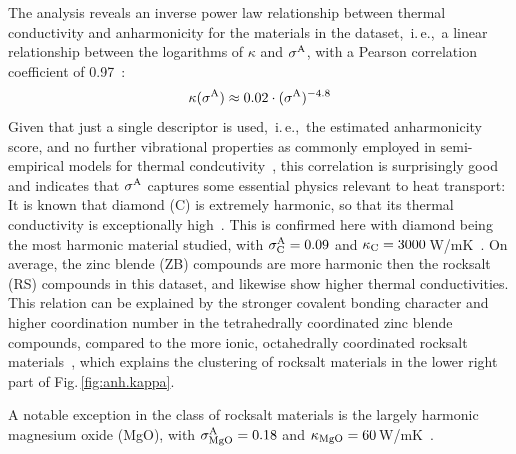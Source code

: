The analysis reveals an inverse power law relationship between thermal conductivity and anharmonicity for the materials in the dataset,~i.\,e.,~a linear relationship between the logarithms of $\kappa$ and $\sigma^\mathrm{A}$, with a Pearson correlation coefficient of 0.97~\cite{Parzen.1960}:
%
\begin{align}
  \kappa (\sigma^\mathrm{A})
    \approx 0.02 \cdot (\sigma^\mathrm{A})^{-4.8}
\end{align}
%
 Given that just a single descriptor is used,~i.\,e.,~the estimated anharmonicity score, and no further vibrational properties as commonly employed in semi-empirical models for thermal condcutivity~\cite{Toberer.2011,Chen.2019}, this correlation is surprisingly good and indicates that $\sigma^\mathrm{A}$ captures some essential physics relevant to heat transport: It is known that diamond (C) is extremely harmonic, so that its thermal conductivity is exceptionally high~\cite{Haas.1938,Klemens.1958}. This is confirmed here with diamond being the most harmonic material studied, with $\sigma^\mathrm{A}_{\rm C} = 0.09$ and $\kappa_{\rm C} = 3000$\,W/mK~\cite{morelLi.2006}. On average, the zinc blende (ZB) compounds are more harmonic then the rocksalt (RS) compounds in this dataset, and likewise show higher thermal conductivities. This relation can be explained by the stronger covalent bonding character and higher coordination number in the tetrahedrally coordinated zinc blende compounds, compared to the more ionic, octahedrally coordinated rocksalt materials~\cite{Miller.2017}, which explains the clustering of rocksalt materials in the lower right part of Fig.\,\ref{fig:anh.kappa}.
 
 A notable exception in the class of rocksalt materials is the largely harmonic magnesium oxide (MgO), with $\sigma^\mathrm{A}_{\rm MgO} = 0.18$ and $\kappa_{\rm MgO} = 60$\,W/mK~\cite{morelLi.2006}.



